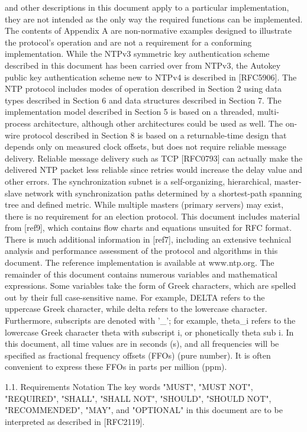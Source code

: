  and other descriptions in this document apply to a particular
 implementation, they are not intended as the only way the required
 functions can be implemented. The contents of Appendix A are non-normative examples designed to illustrate the protocol’s operation
 and are not a requirement for a conforming implementation. While the
 NTPv3 symmetric key authentication scheme described in this document
 has been carried over from NTPv3, the Autokey public key
 authentication scheme new to NTPv4 is described in [RFC5906].
 The NTP protocol includes modes of operation described in Section 2
 using data types described in Section 6 and data structures described
 in Section 7. The implementation model described in Section 5 is
 based on a threaded, multi-process architecture, although other
 architectures could be used as well. The on-wire protocol described
 in Section 8 is based on a returnable-time design that depends only
 on measured clock offsets, but does not require reliable message
 delivery. Reliable message delivery such as TCP [RFC0793] can
 actually make the delivered NTP packet less reliable since retries
 would increase the delay value and other errors. The synchronization
 subnet is a self-organizing, hierarchical, master-slave network with
 synchronization paths determined by a shortest-path spanning tree and
 defined metric. While multiple masters (primary servers) may exist,
 there is no requirement for an election protocol.
 This document includes material from [ref9], which contains flow
 charts and equations unsuited for RFC format. There is much
 additional information in [ref7], including an extensive technical
 analysis and performance assessment of the protocol and algorithms in
 this document. The reference implementation is available at
 www.ntp.org.
 The remainder of this document contains numerous variables and
 mathematical expressions. Some variables take the form of Greek
 characters, which are spelled out by their full case-sensitive name.
 For example, DELTA refers to the uppercase Greek character, while
 delta refers to the lowercase character. Furthermore, subscripts are
 denoted with ’_’; for example, theta_i refers to the lowercase Greek
 character theta with subscript i, or phonetically theta sub i. In
 this document, all time values are in seconds (s), and all
 frequencies will be specified as fractional frequency offsets (FFOs)
 (pure number). It is often convenient to express these FFOs in parts
 per million (ppm).

1.1. Requirements Notation
 The key words "MUST", "MUST NOT", "REQUIRED", "SHALL", "SHALL NOT",
 "SHOULD", "SHOULD NOT", "RECOMMENDED", "MAY", and "OPTIONAL" in this
 document are to be interpreted as described in [RFC2119].
